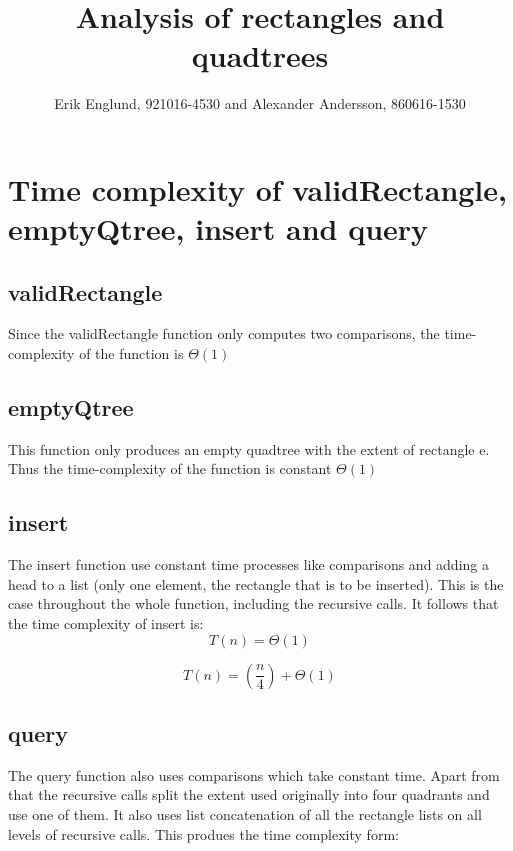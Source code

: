 \documentclass[12pt, a4paper]{article}
\title{Analysis of rectangles and quadtrees}
\author{Erik Englund, 921016-4530 and Alexander Andersson, 860616-1530}
\begin{document}
\maketitle

\section{Time complexity of validRectangle, emptyQtree, insert and query}

\subsection{validRectangle}

Since the validRectangle function only computes two comparisons, the time-complexity of the function is 
$\Theta(1)$




\subsection{emptyQtree}

This function only produces an empty quadtree with the extent of rectangle e. Thus the time-complexity of the function is constant $\Theta(1)$



\subsection{insert}

The insert function use constant time processes like comparisons and adding a head to a list (only one element, the rectangle that is to be inserted). This is the case throughout the whole function, including the recursive calls. It follows that the time complexity of insert is: $$T(n)=\Theta(1)$$

$$T(n)=\left(\frac{n}{4}\right)+\Theta(1)$$



\subsection{query}

The query function also uses comparisons which take constant time. Apart from that the recursive calls split the extent used originally into four quadrants and use one of them. It also uses list concatenation of all the rectangle lists on all levels of recursive calls. This produes the time complexity form:
\end{document}
